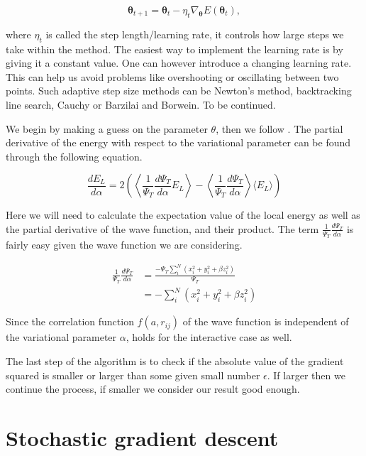 \begin{equation} \label{eq:theta}
\mathbf{\theta}_{t+1} = \mathbf{\theta}_t - \eta_t \nabla_{\mathbf{\theta}} E(\mathbf{\theta}_t),
\end{equation}

where $\eta_t$ is called the step length/learning rate, it controls how large steps we take within the method.
The easiest way to implement the learning rate is by giving it a constant value. One can however introduce a changing learning rate. This can help us avoid problems like overshooting or oscillating between two points. Such adaptive step size methods can be Newton's method, backtracking line search, Cauchy or Barzilai and Borwein. To be continued. 

We begin by making a guess on the parameter $\theta$, then we follow . The partial derivative of the energy with respect to the variational parameter can be found through the following equation.

\begin{equation}
\frac{dE_L}{d\alpha} = 2 \left( \left\langle \frac{1}{\Psi_T}\frac{d \Psi_T}{d \alpha} E_L \right\rangle  - \left\langle  \frac{1}{\Psi_T}\frac{d \Psi_T}{d \alpha} \right\rangle \langle E_L \rangle \right)
\end{equation}

Here we will need to calculate the expectation value of the local energy as well as the partial derivative of the wave function, and their product. The term $\frac{1}{\Psi_T}\frac{d \Psi_T}{d \alpha}$ is fairly easy given the wave function we are considering. 

\begin{align} 
\frac{1}{\Psi_T}\frac{d \Psi_T}{d \alpha} &= \frac{-\Psi_T \sum_i^N (x_i^2 + y_i^2 + \beta z^2_i)}{\Psi_T} \\
&= -\sum_i^N (x_i^2 + y_i^2 + \beta z^2_i) \label{eq:frac_deri_wf}
\end{align}

Since the correlation function $f(a, r_{ij})$ of the wave function is independent of the variational parameter $\alpha$,  holds for the interactive case as well.

The last step of the algorithm is to check if the absolute value of the gradient squared is smaller or larger than some given small number $\epsilon$. If larger then we continue the process, if smaller we consider our result good enough. 

\section{Stochastic gradient descent}

